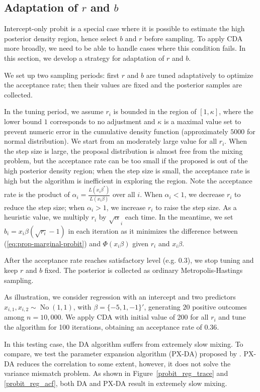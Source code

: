 \documentclass[10pt]{article}
\newcommand{\xbeta}{ x_i \beta}
\DeclareMathOperator{\No}{No}
\begin{document}
\subsection{Adaptation of $r$ and $b$}
Intercept-only probit is a special case where it is possible to estimate the high posterior density region, hence select $b$ and $r$ before sampling. To apply CDA more broadly, we need to be able to handle cases where this condition fails. In this section, we develop a strategy for adaptation of $r$ and $b$.

We set up two sampling periods: first $r$ and $b$ are tuned adaptatively to optimize the acceptance rate; then their values are fixed and the posterior samples are collected.

In the tuning period, we assume $r_i$ is bounded in the region of $[1, \kappa]$, where the lower bound $1$ corresponds to no adjustment and $\kappa$ is a maximal value set to prevent numeric error in the cumulative density function (approximately $5000$ for normal distribution). We start from an moderately large value for all $r_i$. When the step size is large, the proposal distribution is almost free from the mixing problem, but the acceptance rate can be too small if the proposed is out of the high posterior density region; when the step size is small, the acceptance rate is high but the algorithm is inefficient in exploring the region. Note the acceptance rate is the product of  $\alpha_i=\frac{L(x_i \beta^{*})}{L(x_i \beta)}$ over all $i$. When $\alpha_i<1$, we decrease $r_i$ to reduce the step size; when $\alpha_i>1$, we increase $r_i$ to raise the step size. As a heuristic value, we multiply $r_i$ by $\sqrt \alpha_i$ each time. In the meantime, we set $b_i= \xbeta (\sqrt{r_i}-1)$ in each iteration as it minimizes the difference between (\ref{eq:prop-marginal-probit}) and $\Phi(\xbeta)$ given $r_i$ and $\xbeta$.

After the acceptance rate reaches satisfactory level (e.g. $0.3$), we stop tuning and keep $r$ and $b$ fixed. The posterior is collected as ordinary Metropolis-Hastings sampling.

As illustration, we consider regression with an intercept and two predictors $x_{i,1},x_{i,2}\sim \No(1,1)$, with $\beta=\{-5,1,-1\}'$, generating $20$ positive outcomes among $n=10,000$. We apply CDA with initial value of 200 for all $r_i$ and tune the algorithm for 100 iterations, obtaining an acceptance rate of $0.36$.

In this testing case, the \cite{albert1993bayesian} DA algorithm suffers from extremely slow mixing. To compare, we test the parameter expansion algorithm (PX-DA) proposed by \cite{liu1999parameter}. PX-DA reduces the correlation to some extent, however, it does not solve the variance mismatch problem. As shown in Figure~\ref{probit_reg_trace} and \ref{probit_reg_acf}, both DA and PX-DA result in extremely slow mixing. 
\end{document}
